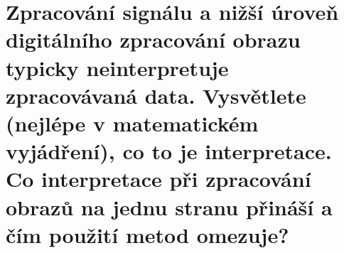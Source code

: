 \section{Zpracování signálu a nižší úroveň digitálního zpracování obrazu typicky neinterpretuje zpracovávaná
data. Vysvětlete (nejlépe v matematickém vyjádření), co to je interpretace. Co interpretace při
zpracování obrazů na jednu stranu přináší a čím použití metod omezuje?}
